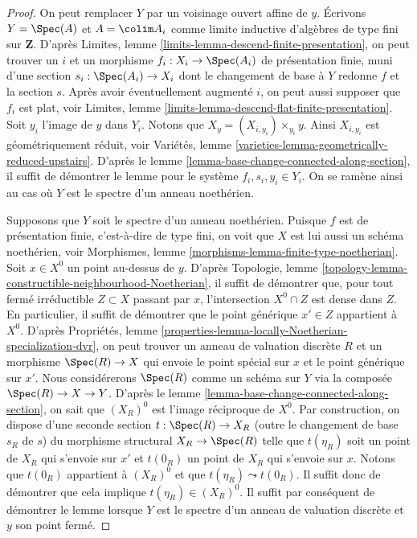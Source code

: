 \begin{proof}
On peut remplacer $Y$ par un voisinage ouvert affine de $y$.
Écrivons $Y = \Spec(A)$ et $A = \colim A_i$ comme limite
inductive d'algèbres de type fini sur $\mathbf{Z}$. D'après
Limites, lemme \ref{limits-lemma-descend-finite-presentation},
on peut trouver un $i$ et un morphisme $f_i : X_i \to \Spec(A_i)$ de
présentation finie, muni d'une section $s_i : \Spec(A_i) \to X_i$
dont le changement de base à $Y$ redonne $f$ et la section $s$.
Après avoir éventuellement augmenté $i$, on peut aussi supposer que $f_i$ est plat, voir
Limites, lemme \ref{limits-lemma-descend-flat-finite-presentation}.
Soit $y_i$ l'image de $y$ dans $Y_i$. Notons que
$X_y = (X_{i, y_i}) \times_{y_i} y$. Ainsi $X_{i, y_i}$ est géométriquement
réduit, voir
Variétés, lemme \ref{varieties-lemma-geometrically-reduced-upstairs}.
D'après le
lemme \ref{lemma-base-change-connected-along-section},
il suffit de démontrer le lemme pour le système $f_i, s_i, y_i \in Y_i$.
On se ramène ainsi au cas où $Y$ est le spectre d'un anneau noethérien.

\medskip\noindent
Supposons que $Y$ soit le spectre d'un anneau noethérien.
Puisque $f$ est de présentation finie,
c'est-à-dire de type fini, on voit que $X$ est lui aussi un schéma noethérien, voir
Morphismes, lemme \ref{morphisms-lemma-finite-type-noetherian}.
Soit $x \in X^0$ un point au-dessus de $y$. D'après
Topologie, lemme \ref{topology-lemma-constructible-neighbourhood-Noetherian},
il suffit de démontrer que, pour tout fermé irréductible $Z \subset X$
passant par $x$, l'intersection $X^0 \cap Z$ est dense dans $Z$.
En particulier, il suffit de démontrer que le point générique $x' \in Z$
appartient à $X^0$. D'après
Propriétés, lemme \ref{properties-lemma-locally-Noetherian-specialization-dvr},
on peut trouver un anneau de valuation discrète $R$ et un morphisme
$\Spec(R) \to X$ qui envoie le point spécial sur $x$ et
le point générique sur $x'$. Nous considérerons $\Spec(R)$
comme un schéma sur $Y$ via la composée $\Spec(R) \to X \to Y$. D'après le
lemme \ref{lemma-base-change-connected-along-section},
on sait que $(X_R)^0$ est l'image réciproque de $X^0$.
Par construction, on dispose d'une seconde section $t : \Spec(R) \to X_R$
(outre le changement de base $s_R$ de $s$)
du morphisme structural $X_R \to \Spec(R)$ telle que
$t(\eta_R)$ soit un point de $X_R$ qui s'envoie sur $x'$ et
$t(0_R)$ un point de $X_R$ qui s'envoie sur $x$. Notons que
$t(0_R)$ appartient à $(X_R)^0$ et que $t(\eta_R) \leadsto t(0_R)$.
Il suffit donc de démontrer que cela implique $t(\eta_R) \in (X_R)^0$.
Il suffit par conséquent de démontrer le lemme lorsque $Y$
est le spectre d'un anneau de valuation discrète et $y$ son point fermé.


\end{proof}
